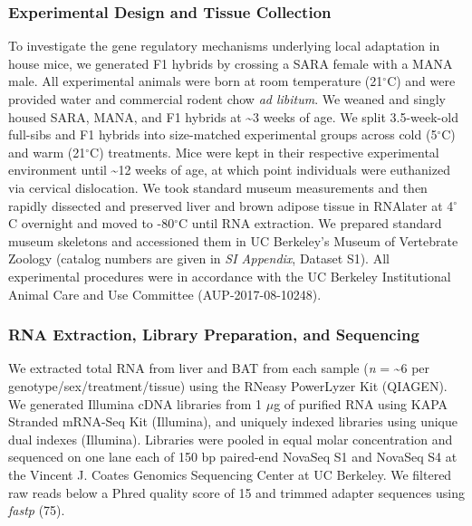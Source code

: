 \documentclass[9pt,twocolumn,twoside,lineno]{pnas-new}
\begin{document}
\hypertarget{experimental-design-and-tissue-collection}{%
\subsubsection*{Experimental Design and Tissue
Collection}\label{experimental-design-and-tissue-collection}}

To investigate the gene regulatory mechanisms underlying local
adaptation in house mice, we generated F1 hybrids by crossing a SARA
female with a MANA male. All experimental animals were born at room
temperature (21\(^{\circ}\)C) and were provided water and commercial
rodent chow \emph{ad libitum}. We weaned and singly housed SARA, MANA,
and F1 hybrids at \textasciitilde3 weeks of age. We split 3.5-week-old
full-sibs and F1 hybrids into size-matched experimental groups across
cold (5\(^{\circ}\)C) and warm (21\(^{\circ}\)C) treatments. Mice were
kept in their respective experimental environment until
\textasciitilde12 weeks of age, at which point individuals were
euthanized via cervical dislocation. We took standard museum
measurements and then rapidly dissected and preserved liver and brown
adipose tissue in RNAlater at 4\(^{\circ}\)C overnight and moved to
-80\(^{\circ}\)C until RNA extraction. We prepared standard museum
skeletons and accessioned them in UC Berkeley's Museum of Vertebrate
Zoology (catalog numbers are given in \emph{SI Appendix}, Dataset S1).
All experimental procedures were in accordance with the UC Berkeley
Institutional Animal Care and Use Committee (AUP-2017-08-10248).

\hypertarget{rna-extraction-library-preparation-and-sequencing}{%
\subsubsection*{RNA Extraction, Library Preparation, and
Sequencing}\label{rna-extraction-library-preparation-and-sequencing}}

We extracted total RNA from liver and BAT from each sample (\emph{n} =
\textasciitilde6 per genotype/sex/treatment/tissue) using the RNeasy
PowerLyzer Kit (QIAGEN). We generated Illumina cDNA libraries from 1
\(\mu\)g of purified RNA using KAPA Stranded mRNA-Seq Kit (Illumina),
and uniquely indexed libraries using unique dual indexes (Illumina).
Libraries were pooled in equal molar concentration and sequenced on one
lane each of 150 bp paired-end NovaSeq S1 and NovaSeq S4 at the Vincent
J. Coates Genomics Sequencing Center at UC Berkeley. We filtered raw
reads below a Phred quality score of 15 and trimmed adapter sequences
using \emph{fastp} (75).
\end{document}
